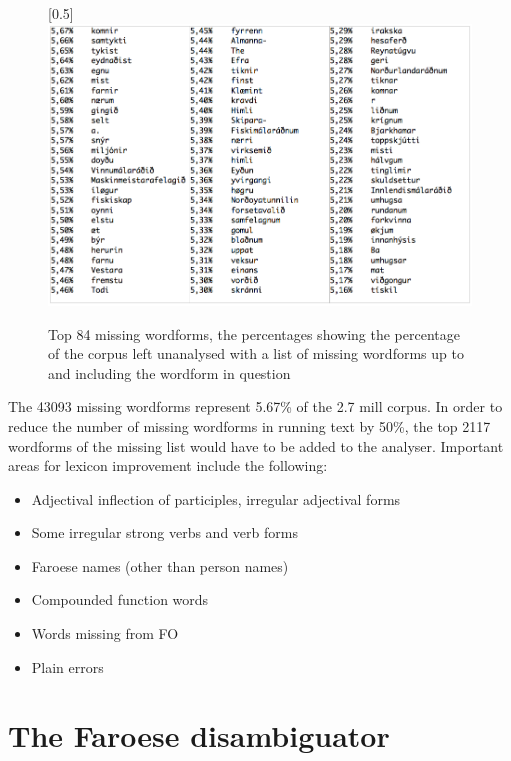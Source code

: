 \documentclass[11pt]{article}
\begin{document}
\begin{figure}[htbp]
\begin{center}
\scalebox{0.5}[0.5]{\includegraphics{img/missing.png}}
\caption{Top 84 missing wordforms, the percentages showing the percentage of the corpus left unanalysed with a list of missing wordforms up to and including the wordform in question}
\label{84miss}
\end{center}
\end{figure}

The 43093 missing wordforms represent 5.67\% of the 2.7 mill corpus. In order to reduce the number of missing wordforms in running text by 50\%, the top 2117 wordforms of the missing list would have to be added to the analyser. Important areas for lexicon improvement include the following:

\begin{itemize}
\setlength{\itemsep}{-0.2cm}
\item Adjectival inflection of participles, irregular adjectival forms
\item Some irregular strong verbs and verb forms
\item Faroese names (other than person names)
\item Compounded function words
\item Words missing from FO
\item Plain errors
\end{itemize}




\section{The Faroese disambiguator}
\end{document}
